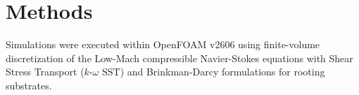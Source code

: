 \documentclass[12pt,a4paper]{article}
\begin{document}
\section*{Methods}

Simulations were executed within OpenFOAM v2606 using finite-volume discretization of the Low-Mach compressible Navier-Stokes equations with Shear Stress Transport ($k\text{-}\omega\text{ SST}$) and Brinkman-Darcy formulations for rooting substrates.



\end{document}
